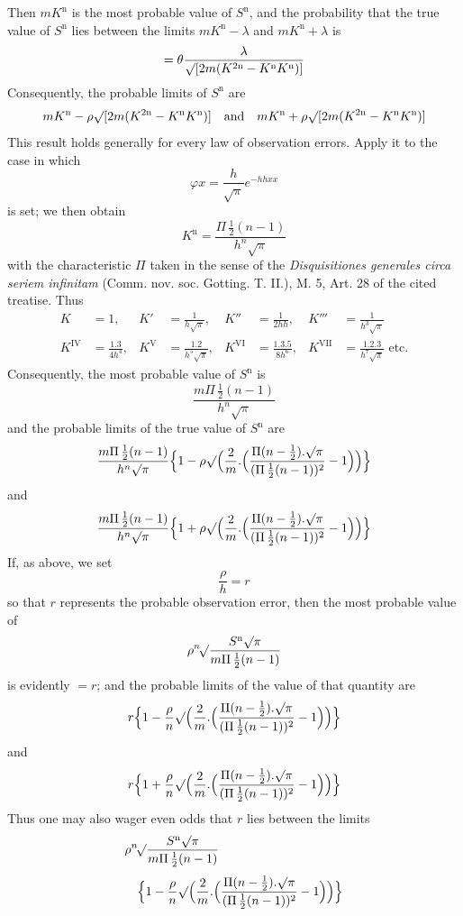 Then \(mK^{\mathrm n}\) is the most probable value of \(S^{\mathrm n}\), and the probability that the true value of \(S^{\mathrm n}\) lies between the limits \(mK^{\mathrm n}-\lambda\) and \(mK^{\mathrm n}+\lambda\) is
\[
=\theta\frac{\lambda}{\surd[2m(K^{2\mathrm n}-K^{\mathrm n}K^{\mathrm n})]}
\]
Consequently, the probable limits of \(S^{\mathrm n}\) are
\[
mK^{\mathrm n}-\rho\surd[2m(K^{2\mathrm n}-K^{\mathrm n}K^{\mathrm n})]\quad\text{and}\quad
mK^{\mathrm n}+\rho\surd[2m(K^{2\mathrm n}-K^{\mathrm n}K^{\mathrm n})]
\]
This result holds generally for every law of observation errors. Apply it to the case in which
\[
\varphi x=\frac h{\surd\pi}e^{-hhxx}
\]
is set; we then obtain
\[
K^{\mathrm n}=\frac{\Pi\,\frac12(n-1)}{h^n\surd\pi}
\]
with the characteristic \(\Pi\) taken in the sense of the \textit{Disquisitiones generales circa seriem infinitam} (Comm. nov. soc. Gotting. T. II.), M. 5, Art. 28 of the cited treatise. Thus
\[
\begin{aligned}
K&=1,&K'&=\frac1{h\surd\pi},&K''&=\frac1{2hh},&K'''&=\frac1{h^3\surd\pi}\\[5pt]
K^{\mathrm{IV}}&=\frac{1.3}{4h^4},&K^{\mathrm{V}}&=\frac{1.2}{h^5\surd\pi},&K^{\mathrm{VI}}&=\frac{1.3.5}{8h^6},&K^{\mathrm{VII}}&=\frac{1.2.3}{h^7\surd\pi}\text{ etc.}
\end{aligned}
\]
Consequently, the most probable value of \(S^{\mathrm n}\) is
\[
\frac{m\Pi\,\frac12(n-1)}{h^n\surd\pi}
\]
and the probable limits of the true value of \(S^{\mathrm n}\) are
\[
\frac{m\Pi\,\frac12(n-1)}{h^n\surd\pi}\Bigl\{1-\rho\surd\Bigl(\frac2m.\Bigl(\frac{\Pi(n-\frac12).\surd\pi}{(\Pi\,\frac12(n-1))^2}-1\Bigr)\Bigr)\Bigr\}
\]
and
\[
\frac{m\Pi\,\frac12(n-1)}{h^n\surd\pi}\Bigl\{1+\rho\surd\Bigl(\frac2m.\Bigl(\frac{\Pi(n-\frac12).\surd\pi}{(\Pi\,\frac12(n-1))^2}-1\Bigr)\Bigr)\Bigr\}
\]
If, as above, we set
\[
\frac\rho h=r
\]
so that \(r\) represents the probable observation error, then the most probable value of
\[
\rho\BareRoot[n]{\frac{S^{\mathrm n}\surd\pi}{m\Pi\,\frac12(n-1)}}
\]
is evidently \(=r\); and the probable limits of the value of that quantity are
\[
r\Bigl\{1-\frac\rho n\surd\Bigl(\frac2m.\Bigl(\frac{\Pi(n-\frac12).\surd\pi}{(\Pi\,\frac12(n-1))^2}-1\Bigr)\Bigr)\Bigr\}
\]
and
\[
r\Bigl\{1+\frac\rho n\surd\Bigl(\frac2m.\Bigl(\frac{\Pi(n-\frac12).\surd\pi}{(\Pi\,\frac12(n-1))^2}-1\Bigr)\Bigr)\Bigr\}
\]
Thus one may also wager even odds that \(r\) lies between the limits
\[
\begin{aligned}
&\rho\BareRoot[n]{\frac{S^{\mathrm n}\surd\pi}{m\Pi\,\frac12(n-1)}}\\[3pt]
&\quad\Bigl\{1-\frac\rho n\surd\Bigl(\frac2m.\Bigl(\frac{\Pi(n-\frac12).\surd\pi}{(\Pi\,\frac12(n-1))^2}-1\Bigr)\Bigr)\Bigr\}
\end{aligned}
\]
